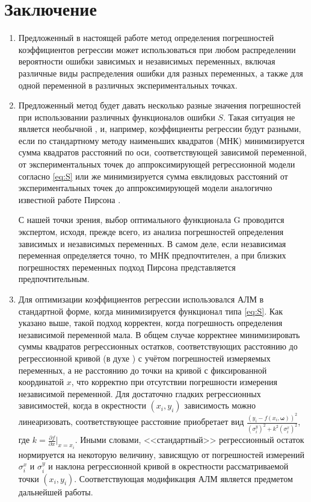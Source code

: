 \documentclass[11pt,a4paper]{article}
\theoremstyle{definition}
\begin{document}
\section{Заключение}

\begin{enumerate}
  \item Предложенный в настоящей работе метод определения погрешностей
	коэффициентов регрессии может использоваться при любом распределении
    вероятности ошибки зависимых и независимых переменных,
    включая различные виды распределения ошибки для разных переменных, а
    также для одной переменной в различных экспериментальных точках.
  \item Предложенный метод будет давать несколько разные значения погрешностей при
    использовании различных функционалов ошибки $S$. Такая ситуация
	не является необычной \cite{Rudoy13}, и, например, коэффициенты регрессии будут разными,
    если по стандартному методу наименьших квадратов (МНК) минимизируется
    сумма квадратов расстояний по оси, соответствующей зависимой переменной, от экспериментальных точек до
	аппроксимирующей регрессионной модели согласно \eqref{eq:S} или же минимизируется сумма
    евклидовых расстояний от экспериментальных точек до аппроксимирующей
	модели аналогично известной работе Пирсона \cite{pearson1901}.

	С нашей точки зрения, выбор оптимального функционала G
	проводится экспертом, исходя, прежде всего, из анализа погрешностей
	определения зависимых и независимых переменных. В самом деле, если
	независимая переменная определяется точно, то МНК предпочтителен, а при
	близких погрешностях переменных подход Пирсона представляется
	предпочтительным.
  \item Для оптимизации коэффициентов регрессии использовался
	АЛМ в стандартной форме, когда минимизируется функционал типа \eqref{eq:S}. Как
	указано выше, такой подход корректен, когда погрешность определения независимой
	переменной мала. В общем случае корректнее минимизировать суммы квадратов регрессионных остатков,
	соответствующих расстоянию до регрессионной кривой (в духе \cite{pearson1901}) с учётом
	погрешностей измеряемых переменных, а не расстоянию до точки на кривой
	с фиксированной координатой $x$, что корректно при отсутствии погрешности
	измерения независимой переменной. Для достаточно гладких регрессионных
	зависимостей, когда в окрестности $(x_i, y_i)$ зависимость можно линеаризовать,
	соответствующее расстояние приобретает вид
	$\frac{(y_i - f(x_i, \boldsymbol{\omega}))^2}{(\sigma^y_i)^2 + k^2 (\sigma^x_i)^2}$,
	где $k = \frac{\partial f}{\partial x} |_{x = x_i}$. Иными словами,
	<<стандартный>> регрессионный остаток нормируется на некоторую величину,
	зависящую от погрешностей измерений $\sigma^x_i$ и $\sigma^y_i$ и
	наклона регрессионной кривой в окрестности рассматриваемой точки $(x_i, y_i)$.
	Соответствующая модификация АЛМ является предметом дальнейшей работы.


\end{enumerate}
\end{document}
